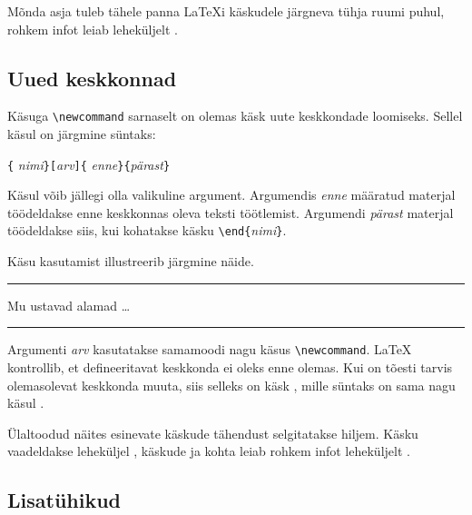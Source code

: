 Mõnda asja tuleb tähele panna \LaTeX i käskudele järgneva tühja ruumi
puhul, rohkem infot leiab leheküljelt \pageref{whitespace}.

\subsection{Uued keskkonnad}

Käsuga \verb|\newcommand| sarnaselt on olemas käsk uute keskkondade
loomiseks. Sellel käsul  on järgmine süntaks:

\begin{lscommand}
\verb|{|%
       \emph{nimi}\verb|}[|\emph{arv}\verb|]{|%
       \emph{enne}\verb|}{|\emph{pärast}\verb|}|
\end{lscommand}

Käsul  võib jällegi olla valikuline argument.
Argumendis \emph{enne} määratud materjal töödeldakse enne keskkonnas
oleva teksti töötlemist. Argumendi \emph{pärast} materjal töödeldakse
siis, kui kohatakse käsku \verb|\end{|\emph{nimi}\verb|}|.

Käsu  kasutamist illustreerib järgmine näide.
\begin{example}
\newenvironment{kuningas}
 {\rule{1ex}{1ex}%
      \hspace{\stretch{1}}}
 {%
      \rule{1ex}{1ex}}

\begin{kuningas}
Mu ustavad alamad \ldots
\end{kuningas}
\end{example}

Argumenti \emph{arv} kasutatakse samamoodi nagu käsus
\verb|\newcommand|. \LaTeX{} kontrollib, et defineeritavat keskkonda ei
oleks enne olemas. Kui on tõesti tarvis olemasolevat keskkonda muuta,
siis selleks on käsk , mille süntaks on sama nagu
käsul .

Ülaltoodud näites esinevate käskude tähendust selgitatakse hiljem. Käsku
 vaadeldakse leheküljel \pageref{sec:rule}, käskude 
ja  kohta leiab rohkem infot leheküljelt
\pageref{sec:hspace}.

\subsection{Lisatühikud}

